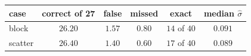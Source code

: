 \begin{center}
\begin{tabular}{lccccc}
case & correct of 27 & false & missed & exact & median $\hat\sigma$ \\
\hline
block & $26.20$ & $1.57$ & $0.80$ & $14$ of $40$ & $0.091$ \\
scatter & $26.40$ & $1.40$ & $0.60$ & $17$ of $40$ & $0.089$ \\
\end{tabular}
\end{center}
